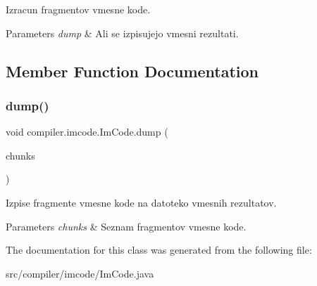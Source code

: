 Izracun fragmentov vmesne kode.


\begin{DoxyParams}{Parameters}
{\em dump} & Ali se izpisujejo vmesni rezultati. \\
\hline
\end{DoxyParams}


\subsection{Member Function Documentation}
\mbox{\label{classcompiler_1_1imcode_1_1_im_code_adabd673785a066bfbfd206e6438299da}} 
\subsubsection{\texorpdfstring{dump()}{dump()}}
{\footnotesize\ttfamily void compiler.\+imcode.\+Im\+Code.\+dump (\begin{DoxyParamCaption}\item[{Linked\+List$<$ \hyperlink{classcompiler_1_1imcode_1_1_imc_chunk}{Imc\+Chunk} $>$}]{chunks }\end{DoxyParamCaption})}

Izpise fragmente vmesne kode na datoteko vmesnih rezultatov.


\begin{DoxyParams}{Parameters}
{\em chunks} & Seznam fragmentov vmesne kode. \\
\hline
\end{DoxyParams}


The documentation for this class was generated from the following file\+:\begin{DoxyCompactItemize}
\item 
src/compiler/imcode/Im\+Code.\+java\end{DoxyCompactItemize}
